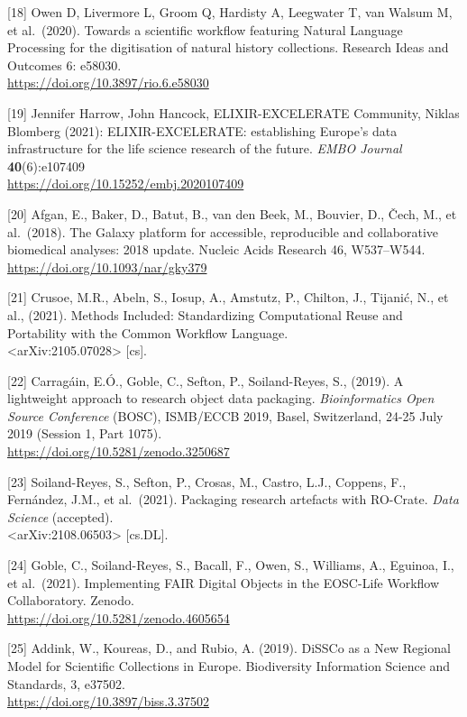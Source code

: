 {[}18{]} Owen D, Livermore L, Groom Q, Hardisty A, Leegwater T, van
Walsum M, et al.~(2020). Towards a scientific workflow featuring Natural
Language Processing for the digitisation of natural history collections.
Research Ideas and Outcomes 6: e58030.\\
\url{https://doi.org/10.3897/rio.6.e58030}

{[}19{]} Jennifer Harrow, John Hancock, ELIXIR-EXCELERATE Community,
Niklas Blomberg (2021): ELIXIR-EXCELERATE: establishing Europe's data
infrastructure for the life science research of the future. \emph{EMBO
Journal} \textbf{40}(6):e107409\\
\url{https://doi.org/10.15252/embj.2020107409}

{[}20{]} Afgan, E., Baker, D., Batut, B., van den Beek, M., Bouvier, D.,
Čech, M., et al.~(2018). The Galaxy platform for accessible,
reproducible and collaborative biomedical analyses: 2018 update. Nucleic
Acids Research 46, W537--W544.\\
\url{https://doi.org/10.1093/nar/gky379}

{[}21{]} Crusoe, M.R., Abeln, S., Iosup, A., Amstutz, P., Chilton, J.,
Tijanić, N., et al., (2021). Methods Included: Standardizing
Computational Reuse and Portability with the Common Workflow Language.\\
\textless arXiv:2105.07028\textgreater{} {[}cs{]}.

{[}22{]} Carragáin, E.Ó., Goble, C., Sefton, P., Soiland-Reyes, S.,
(2019). A lightweight approach to research object data packaging.
\emph{Bioinformatics Open Source Conference} (BOSC), ISMB/ECCB 2019,
Basel, Switzerland, 24-25 July 2019 (Session 1, Part 1075).\\
\url{https://doi.org/10.5281/zenodo.3250687}

{[}23{]} Soiland-Reyes, S., Sefton, P., Crosas, M., Castro, L.J.,
Coppens, F., Fernández, J.M., et al.~(2021). Packaging research
artefacts with RO-Crate. \emph{Data Science} (accepted).\\
\textless arXiv:2108.06503\textgreater{} {[}cs.DL{]}.

{[}24{]} Goble, C., Soiland-Reyes, S., Bacall, F., Owen, S., Williams,
A., Eguinoa, I., et al.~(2021). Implementing FAIR Digital Objects in the
EOSC-Life Workflow Collaboratory. Zenodo.\\
\url{https://doi.org/10.5281/zenodo.4605654}

{[}25{]} Addink, W., Koureas, D., and Rubio, A. (2019). DiSSCo as a New
Regional Model for Scientific Collections in Europe. Biodiversity
Information Science and Standards, 3, e37502.\\
\url{https://doi.org/10.3897/biss.3.37502}

